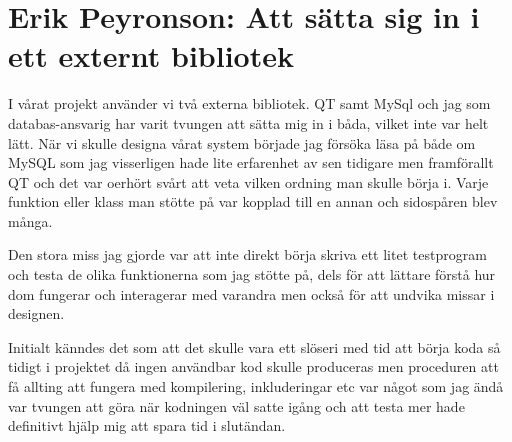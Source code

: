 \section {Erik Peyronson: Att sätta sig in i ett externt bibliotek}

I vårat projekt använder vi två externa bibliotek. QT samt MySql och
jag som databas-ansvarig har varit tvungen att sätta mig in i
båda, vilket inte var helt lätt. När vi skulle designa vårat system
började jag försöka läsa på både om MySQL som jag visserligen hade
lite erfarenhet av sen tidigare men framförallt QT och det var oerhört
svårt att veta vilken ordning man skulle börja i. Varje funktion eller
klass man stötte på var kopplad till en annan och sidospåren blev
många.

Den stora miss jag gjorde var att inte direkt börja skriva ett litet
testprogram och testa de olika funktionerna som jag stötte på, dels
för att lättare förstå hur dom fungerar och interagerar med varandra
men också för att undvika missar i designen.

Initialt känndes det som att det skulle vara ett slöseri med tid att
börja koda så tidigt i projektet då ingen användbar kod skulle
produceras men proceduren att få allting att fungera med kompilering,
inkluderingar etc var något som jag ändå var tvungen att göra när
kodningen väl satte igång och att testa mer hade definitivt hjälp mig
att spara tid i slutändan.
